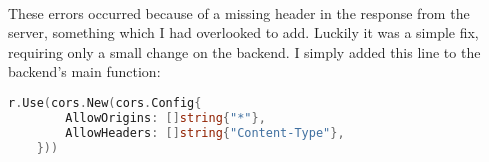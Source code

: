 \documentclass[../../main.tex]{subfiles}
\begin{document}
\noindent \\ These errors occurred because of a missing header in the response
from the server, something which I had overlooked to add. Luckily it was a simple fix,
requiring only a small change on the backend. I simply added this line to
the backend's main function:

\begin{lstlisting}[language=Go]
  r.Use(cors.New(cors.Config{
		AllowOrigins: []string{"*"},
		AllowHeaders: []string{"Content-Type"},
	}))
\end{lstlisting}



\begin{comment}
\subsubsection{Configuring Apollo Client to talk to the backend component}


\begin{lstlisting}[language=typescript]
  // Define a hook to be called within SessionProvider to access the session
  export function useSession() {
    const value = React.useContext(AuthContext)

    if (process.env.NODE_ENV !== 'production') {
      if (!value) {
        throw new Error('useSession must be wrapped in a <SessionProvider />');
      }
    }
    return value;
  }
\end{lstlisting}
\end{comment}
\end{document}
